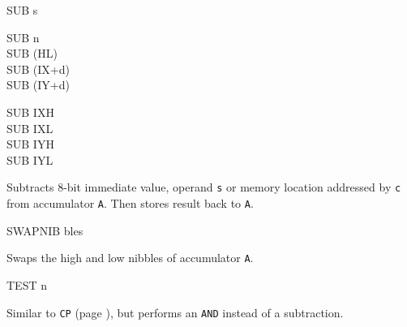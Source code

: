 \begin{basedescript}{
	\desclabelstyle{\multilinelabel}
	\desclabelwidth{3cm}}
\begin{DetailItem}{SUB s}
\begin{DetailVariants}
			\columnbreak
			SUB n\\
			SUB (HL)\\
			SUB (IX+d)\\
			SUB (IY+d)

			\columnbreak
			SUB IXH\UNDOC\\
			SUB IXL\UNDOC\\
			SUB IYH\UNDOC\\
			SUB IYL\UNDOC
		\end{DetailVariants}

		Subtracts 8-bit immediate value, operand {\tt s} or memory location addressed by {\tt c} from accumulator {\tt A}. Then stores result back to {\tt A}.

		\begin{DetailEffects}[v]
			\FlagsSUBr
		\end{DetailEffects}
						
		\begin{DetailTiming}
		\end{DetailTiming}

	\end{DetailItem}

	\begin{DetailItem}{SWAPNIB\ZXN}
		{ bles}
		{\SymSWAPNIB}

		Swaps the high and low nibbles of accumulator {\tt A}.

		\begin{DetailEffects}
			\FlagsSWAPNIB
		\end{DetailEffects}
						
		\begin{DetailTiming}
			\DetailTime{2}{8}
		\end{DetailTiming}

	\end{DetailItem}

	\begin{DetailItem}{TEST n\ZXN}
		{\IH{TEST}}
		{\SymTEST}

		Similar to {\tt CP} (page \pageref{DetailRefCP}), but performs an {\tt AND} instead of a subtraction.

		\begin{DetailEffects}[p]
			\FlagsTESTn
		\end{DetailEffects}
						
		\begin{DetailTiming}
			\DetailTime{3}{11}
		\end{DetailTiming}


\end{DetailItem}
\end{basedescript}

